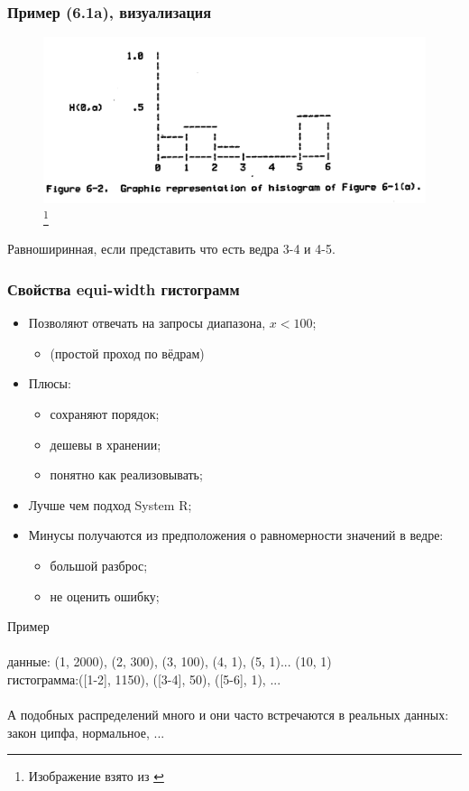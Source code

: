 \documentclass{beamer}
\begin{document}
\begin{frame}
\frametitle{Пример (6.1a), визуализация}

\begin{figure}[htb]
\includegraphics[width=\textwidth,height=0.79\textheight,keepaspectratio]{histogram-example-kooi-2.png} 
\footnote{\tiny{Изображение взято из \cite{Kooi1980}}}
\end{figure}

Равноширинная, если представить что есть ведра 3-4 и 4-5.

\end{frame}

\begin{frame}
\frametitle{Свойства equi-width гистограмм}


\begin{itemize}
  \item Позволяют отвечать на запросы диапазона, $x<100$;
  \begin{itemize}
    \item[] (простой проход по вёдрам)
  \end{itemize}      
  \item Плюсы: 
  \begin{itemize}
    \item сохраняют порядок;
    \item дешевы в хранении;
    \item понятно как реализовывать;
  \end{itemize}  
  \item Лучше чем подход System R;
  \item Минусы получаются из предположения о равномерности значений в ведре: 
  \begin{itemize}
    \item большой разброс;
    \item не оценить ошибку;
  \end{itemize}    
\end{itemize}

Пример\\~\\ 
данные: (1, 2000), (2, 300), (3, 100), (4, 1), (5, 1)... (10, 1)\\
гистограмма:([1-2], 1150), ([3-4], 50), ([5-6], 1), ...\\~\\
\scriptsize
А подобных распределений много и они часто встречаются в реальных данных: закон ципфа, нормальное, ...
\end{frame}
\end{document}
